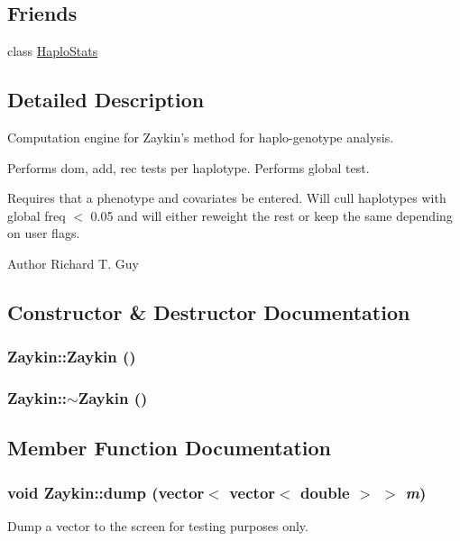 \subsection*{Friends}
\begin{DoxyCompactItemize}
\item 
class \hyperlink{classZaykin_ab5eb8e85b324a9728c593bdc1ada8198}{HaploStats}
\end{DoxyCompactItemize}


\subsection{Detailed Description}
Computation engine for Zaykin's method for haplo-\/genotype analysis.

Performs dom, add, rec tests per haplotype. Performs global test.

Requires that a phenotype and covariates be entered. Will cull haplotypes with global freq $<$ 0.05 and will either reweight the rest or keep the same depending on user flags.

\begin{DoxyAuthor}{Author}
Richard T. Guy 
\end{DoxyAuthor}


\subsection{Constructor \& Destructor Documentation}
\hypertarget{classZaykin_a63cb6e8305dab0de45215665b45259a3}{
\subsubsection[{Zaykin}]{\setlength{\rightskip}{0pt plus 5cm}Zaykin::Zaykin ()}}
\label{classZaykin_a63cb6e8305dab0de45215665b45259a3}
\hypertarget{classZaykin_a29f455c179a9dddc260fc6a580be2611}{
\subsubsection[{$\sim$Zaykin}]{\setlength{\rightskip}{0pt plus 5cm}Zaykin::$\sim$Zaykin ()}}
\label{classZaykin_a29f455c179a9dddc260fc6a580be2611}


\subsection{Member Function Documentation}
\hypertarget{classZaykin_a3a3b137409b8c862a66c70ce199721f6}{
\subsubsection[{dump}]{\setlength{\rightskip}{0pt plus 5cm}void Zaykin::dump (vector$<$ vector$<$ double $>$ $>$ {\em m})}}
\label{classZaykin_a3a3b137409b8c862a66c70ce199721f6}
Dump a vector to the screen for testing purposes only.


